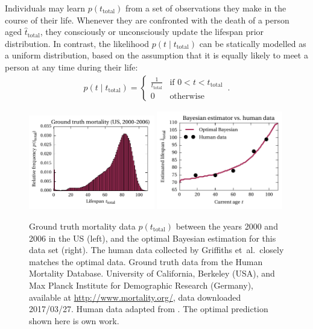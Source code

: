 \documentclass[a4paper,11pt]{article}
\begin{document}
Individuals may learn $p(t_\mathrm{total})$ from a set of observations they make in the course of their life. Whenever they are confronted with the death of a person aged $\hat t_\mathrm{total}$, they consciously or unconsciously update the lifespan prior distribution. In contrast, the likelihood $p(t \mid t_\mathrm{total})$ can be statically modelled as a uniform distribution, based on the assumption that it is equally likely to meet a person at any time during their life:
\begin{align}
	p(t \mid t_\mathrm{total}) = \begin{cases}
	                           \frac{1}{t_\mathrm{total}} & \text{if } 0 < t < t_\mathrm{total} \\
	                           0 & \text{otherwise}
	                          \end{cases} \,.
\end{align}
\begin{figure}
	\includegraphics[width=0.49\textwidth]{media/mortality_ground_truth.pdf}
	\includegraphics[width=0.49\textwidth]{media/mortality_optimal_bayesian_estimator.pdf}
	\caption{Ground truth mortality data $p(t_\mathrm{total})$ between the years 2000 and 2006 in the US (left), and the optimal Bayesian estimation for this data set (right). The human data collected by Griffiths et~al.~closely matches the optimal data. Ground truth data from the Human Mortality Database. University of California, Berkeley (USA), and Max Planck Institute for Demographic Research (Germany), available at \url{http://www.mortality.org/}, data downloaded 2017/03/27. Human data adapted from \cite{griffiths2006optimal}. The optimal prediction shown here is own work.}
	\label{fig:mortality_optimal}
\end{figure}
\end{document}
